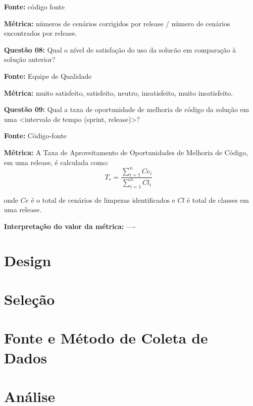 \textbf{Fonte:} código fonte

\textbf{Métrica:} números de cenários corrigidos por release / número de cenários encontrados por release. \newline



\textbf{Questão 08:} Qual o nível de satisfação do uso da solucão em comparação à solução anterior?

\textbf{Fonte:} Equipe de Qualidade

\textbf{Métrica:} muito satisfeito, satisfeito, neutro, insatisfeito, muito insatisfeito. \newline




\textbf{Questão 09:} Qual a taxa de oportunidade de melhoria de código da solução em uma <intervalo de tempo (sprint, release)>?

\textbf{Fonte:} Código-fonte

\textbf{Métrica:}  A Taxa de Aproveitamento de Oportunidades de Melhoria de Código, em uma release, é calculada como: $$ T_r =   \frac{{\sum_{i=1}^{n}{Ce_i}}}{\sum_{i=1}^{n}{Cl_i}} $$

onde $ Ce $ é o total de cenários de limpezas identificados e $ Cl $ é total de classes em uma release.

\textbf{Interpretação do valor da métrica:} ----  \newline

\section{Design}\label{sec:Design}

\section{Seleção}\label{sec:Seleção}

\section{Fonte e Método de Coleta de Dados}\label{sec:Fonte e Método de Coleta de Dados}

\section{Análise}\label{sec:Análise}

